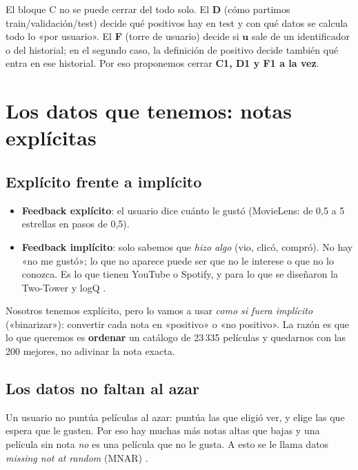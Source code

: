 \documentclass[a4paper,11pt]{article}
\begin{document}
\begin{ojo}
El bloque C no se puede cerrar del todo solo. El \textbf{D} (cómo partimos train/validación/test) decide qué positivos
hay en test y con qué datos se calcula todo lo «por usuario». El \textbf{F} (torre de usuario) decide si $\mathbf{u}$
sale de un identificador o del historial; en el segundo caso, la definición de positivo decide también qué entra en
ese historial. Por eso proponemos cerrar \textbf{C1, D1 y F1 a la vez}.
\end{ojo}

\section{Los datos que tenemos: notas explícitas}

\subsection{Explícito frente a implícito}
\begin{itemize}
  \item \textbf{Feedback explícito}: el usuario dice cuánto le gustó (MovieLens: de 0,5 a 5 estrellas en pasos de 0,5).
  \item \textbf{Feedback implícito}: solo sabemos que \emph{hizo algo} (vio, clicó, compró). No hay «no me gustó»; lo que
        no aparece puede ser que no le interese o que no lo conozca. Es lo que tienen YouTube o Spotify, y para lo que se
        diseñaron la Two-Tower y logQ \cite{hu2008,rendle2009,covington2016,yi2019}.
\end{itemize}

Nosotros tenemos explícito, pero lo vamos a usar \emph{como si fuera implícito} («binarizar»): convertir cada nota en
«positivo» o «no positivo». La razón es que lo que queremos es \textbf{ordenar} un catálogo de 23\,335 películas y
quedarnos con las 200 mejores, no adivinar la nota exacta.

\subsection{Los datos no faltan al azar}
Un usuario no puntúa películas al azar: puntúa las que eligió ver, y elige las que espera que le gusten. Por eso hay
muchas más notas altas que bajas y una película sin nota \emph{no} es una película que no le gusta. A esto se le llama
datos \emph{missing not at random} (MNAR) \cite{marlin2009}.
\end{document}
